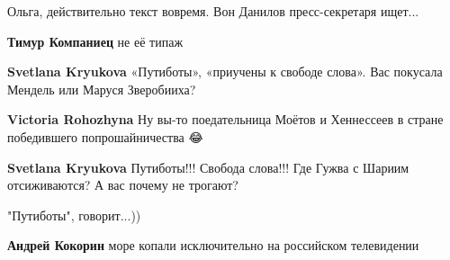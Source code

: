 \begin{itemize}
\begin{itemize}
Ольга, действительно текст вовремя. Вон Данилов пресс-секретаря ищет...

 
\textbf{Тимур Компаниец} не её типаж

 
\textbf{Svetlana Kryukova} «Путиботы», «приучены к свободе слова». Вас покусала Мендель или Маруся Зверобииха? 🧐

 
\textbf{Victoria Rohozhyna} Ну вы-то поедательница Моётов и Хеннессеев в стране победившего попрошайничества 😂

 
\textbf{Svetlana Kryukova} Путиботы!!! Свобода слова!!! Где Гужва с Шариим отсиживаются? А вас почему не трогают?

 
"Путиботы", говорит...))

 
\textbf{Андрей Кокорин} море копали исключительно на российском телевидении

 

\end{itemize}
\end{itemize}
